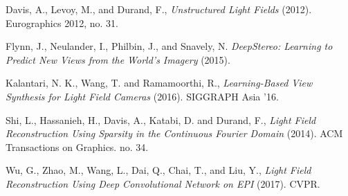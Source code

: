 \documentclass[12pt]{report}
\begin{document}
\begin{thebibliography}{10}%
	Davis, A., Levoy, M., and Durand, F., \emph{Unstructured Light Fields} (2012). Eurographics 2012, no. 31.

	Flynn, J., Neulander, I., Philbin, J., and Snavely, N. \emph{DeepStereo: Learning to Predict New Views from the World's Imagery} (2015).

	Kalantari, N. K., Wang, T. and Ramamoorthi, R., \emph{Learning-Based View Synthesis for Light Field Cameras} (2016). SIGGRAPH Asia '16.
		
	Shi, L., Hassanieh, H., Davis, A., Katabi, D. and Durand, F., \emph{Light Field Reconstruction Using Sparsity in the Continuous Fourier Domain} (2014). ACM Transactions on Graphics. no. 34.

	Wu, G., Zhao, M., Wang, L., Dai, Q., Chai, T., and Liu, Y., \emph{Light Field Reconstruction Using Deep Convolutional Network on EPI} (2017). CVPR.

\end{thebibliography}
\end{document}
